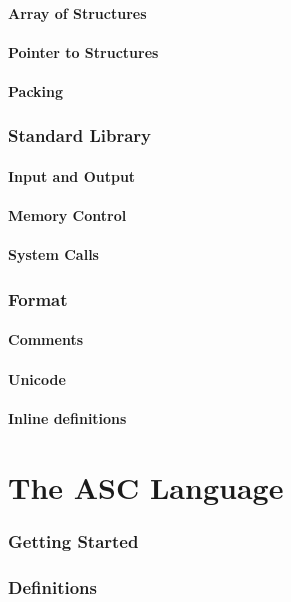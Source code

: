 \documentclass{scrartcl}
\begin{document}
        \subsection{Array of Structures}
        \subsection{Pointer to Structures}
        \subsection{Packing}
    \section{Standard Library}
        \subsection{Input and Output}
        \subsection{Memory Control}
        \subsection{System Calls}
    \section{Format}
        \subsection{Comments}
        \subsection{Unicode}
        \subsection{Inline definitions}
\part{The ASC Language}
    \section{Getting Started}
    \section{Definitions}
\end{document}
